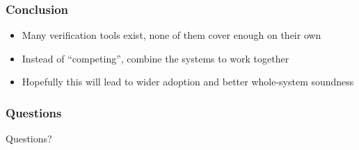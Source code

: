 \documentclass[compress]{beamer}
\begin{document}
\begin{frame}
  \frametitle{Conclusion}

  \begin{itemize}
    \item Many verification tools exist, none of them cover enough on their own
    \item Instead of ``competing'', combine the systems to work together
    \item Hopefully this will lead to wider adoption and better whole-system
          soundness
  \end{itemize}

\end{frame}

\begin{frame}
  \frametitle{Questions}

  \begin{center}
    \begin{alertblock}{Questions?}
    \end{alertblock}
  \end{center}

\end{frame}
\end{document}
